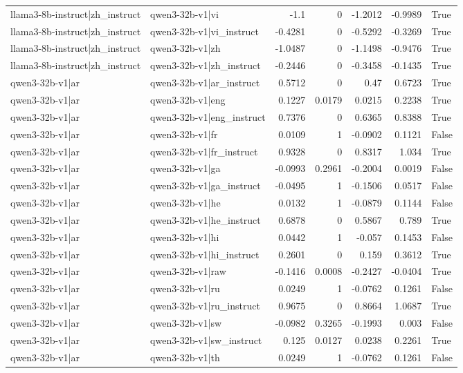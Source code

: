 \begin{table}
\begin{tabular}{l l r r r r l}
llama3-8b-instruct|zh_instruct & qwen3-32b-v1|vi & -1.1 & 0 & -1.2012 & -0.9989 & True \\
llama3-8b-instruct|zh_instruct & qwen3-32b-v1|vi_instruct & -0.4281 & 0 & -0.5292 & -0.3269 & True \\
llama3-8b-instruct|zh_instruct & qwen3-32b-v1|zh & -1.0487 & 0 & -1.1498 & -0.9476 & True \\
llama3-8b-instruct|zh_instruct & qwen3-32b-v1|zh_instruct & -0.2446 & 0 & -0.3458 & -0.1435 & True \\
qwen3-32b-v1|ar & qwen3-32b-v1|ar_instruct & 0.5712 & 0 & 0.47 & 0.6723 & True \\
qwen3-32b-v1|ar & qwen3-32b-v1|eng & 0.1227 & 0.0179 & 0.0215 & 0.2238 & True \\
qwen3-32b-v1|ar & qwen3-32b-v1|eng_instruct & 0.7376 & 0 & 0.6365 & 0.8388 & True \\
qwen3-32b-v1|ar & qwen3-32b-v1|fr & 0.0109 & 1 & -0.0902 & 0.1121 & False \\
qwen3-32b-v1|ar & qwen3-32b-v1|fr_instruct & 0.9328 & 0 & 0.8317 & 1.034 & True \\
qwen3-32b-v1|ar & qwen3-32b-v1|ga & -0.0993 & 0.2961 & -0.2004 & 0.0019 & False \\
qwen3-32b-v1|ar & qwen3-32b-v1|ga_instruct & -0.0495 & 1 & -0.1506 & 0.0517 & False \\
qwen3-32b-v1|ar & qwen3-32b-v1|he & 0.0132 & 1 & -0.0879 & 0.1144 & False \\
qwen3-32b-v1|ar & qwen3-32b-v1|he_instruct & 0.6878 & 0 & 0.5867 & 0.789 & True \\
qwen3-32b-v1|ar & qwen3-32b-v1|hi & 0.0442 & 1 & -0.057 & 0.1453 & False \\
qwen3-32b-v1|ar & qwen3-32b-v1|hi_instruct & 0.2601 & 0 & 0.159 & 0.3612 & True \\
qwen3-32b-v1|ar & qwen3-32b-v1|raw & -0.1416 & 0.0008 & -0.2427 & -0.0404 & True \\
qwen3-32b-v1|ar & qwen3-32b-v1|ru & 0.0249 & 1 & -0.0762 & 0.1261 & False \\
qwen3-32b-v1|ar & qwen3-32b-v1|ru_instruct & 0.9675 & 0 & 0.8664 & 1.0687 & True \\
qwen3-32b-v1|ar & qwen3-32b-v1|sw & -0.0982 & 0.3265 & -0.1993 & 0.003 & False \\
qwen3-32b-v1|ar & qwen3-32b-v1|sw_instruct & 0.125 & 0.0127 & 0.0238 & 0.2261 & True \\
qwen3-32b-v1|ar & qwen3-32b-v1|th & 0.0249 & 1 & -0.0762 & 0.1261 & False \\

\end{tabular}
\end{table}
